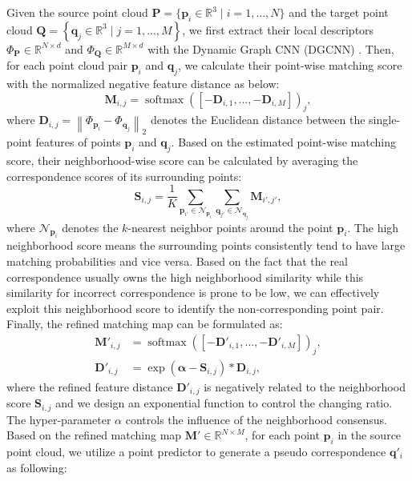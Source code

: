 \documentclass[letterpaper]{article} %
\begin{document}
	Given the source point cloud $\mathbf{P}=\{\mathbf{p}_i\in\mathbb{R}^3\mid i=1,...,N\}$ and the target point cloud $\mathbf{Q}=\left\{\mathbf{q}_j\in\mathbb{R}^3 \mid j=1,...,M\right\}$, we first extract their local descriptors ${\Phi}_{\mathbf{P}}\in\mathbb{R}^{N\times d}$ and ${\Phi}_{\mathbf{Q}}\in\mathbb{R}^{M\times d}$ with the Dynamic Graph CNN (DGCNN) \cite{wang2019dynamic}. Then, for each point cloud pair $\mathbf{p}_i$ and $\mathbf{q}_j$, we calculate their point-wise matching score with the normalized negative feature distance as below:
	\begin{equation}\label{M1}
	\mathbf{M}_{i,j}= \operatorname{softmax} \left(\left[-\mathbf{D}_{i,1},\ldots, -\mathbf{D}_{i,M}\right]\right)_{j},
	\end{equation}
	where $\mathbf{D}_{i,j} = \left\|{\Phi}_{\mathbf{p}_i} - {\Phi}_{\mathbf{q}_j}\right\|_2$ denotes the Euclidean distance between the single-point features of points $\mathbf{p}_i$ and $\mathbf{q}_j$. 
	Based on the estimated point-wise matching score, their neighborhood-wise score can be calculated by averaging the correspondence scores of its surrounding points: 
	\begin{equation}\label{eq1}
	\mathbf{S}_{i,j}= \frac{1}{K}\sum_{\mathbf{p}_{i'} \in \mathcal{N}_{\mathbf{p}_i}}\sum_{\mathbf{q}_{j'} \in \mathcal{N}_{\mathbf{q}_j}}\mathbf{M}_{i',j'},
	\end{equation}
	where $\mathcal{N}_{\mathbf{p}_i}$ denotes the $k$-nearest neighbor points around the point $\mathbf{p}_i$. 
	The high neighborhood score means the surrounding points consistently tend to have large matching probabilities and vice versa. 
	Based on the fact that the real correspondence usually owns the high neighborhood similarity while this similarity for incorrect correspondence is prone to be low,
	we can effectively exploit this neighborhood score to identify the non-corresponding point pair.
	Finally, the refined matching map can be formulated as:
	\begin{equation}\label{eq0}
	\begin{split}
	\mathbf{M}'_{i,j}&= \operatorname{softmax} \left(\left[-\mathbf{D}'_{i,1},\ldots, -\mathbf{D}'_{i,M}\right]\right)_{j},\\
	\mathbf{D}{'}_{i,j} &= \exp \left(\mathbf{\alpha} - \mathbf{S}_{i,j}\right) * \mathbf{D}_{i,j},
	\end{split}
	\end{equation}
	where the refined feature distance $\mathbf{D}'_{i,j}$ is negatively related to the neighborhood score  $\mathbf{S}_{i,j}$ and we design an exponential function to control the changing ratio. The hyper-parameter $\alpha$ controls the influence of the neighborhood consensus. Based on the refined matching map $\mathbf{M}' \in \mathbb{R}^{N \times M}$, for each point $\mathbf{p}_i$ in the source point cloud, we utilize a point predictor to generate a pseudo correspondence $\mathbf{q}'_i$ as following:
\end{document}
